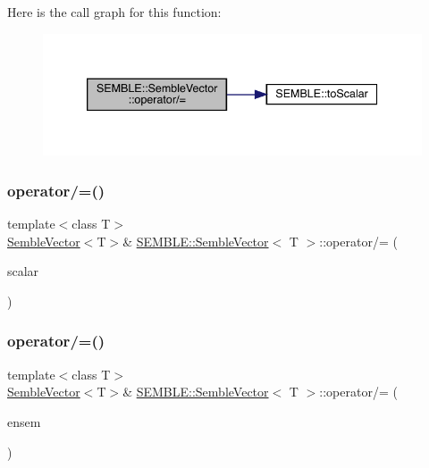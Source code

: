 Here is the call graph for this function\+:
\nopagebreak
\begin{figure}[H]
\begin{center}
\leavevmode
\includegraphics[width=339pt]{d9/d94/structSEMBLE_1_1SembleVector_a4158fb12d451d53f12b9f922d8106630_cgraph}
\end{center}
\end{figure}
\mbox{\label{structSEMBLE_1_1SembleVector_a00a31502846c4ed836390808446882e8}} 
\subsubsection{\texorpdfstring{operator/=()}{operator/=()}\hspace{0.1cm}{\footnotesize\ttfamily [4/6]}}
{\footnotesize\ttfamily template$<$class T$>$ \\
\mbox{\hyperlink{structSEMBLE_1_1SembleVector}{Semble\+Vector}}$<$T$>$\& \mbox{\hyperlink{structSEMBLE_1_1SembleVector}{S\+E\+M\+B\+L\+E\+::\+Semble\+Vector}}$<$ T $>$\+::operator/= (\begin{DoxyParamCaption}\item[{const typename \mbox{\hyperlink{structSEMBLE_1_1PromoteScalar}{Promote\+Scalar}}$<$ T $>$\+::Type \&}]{scalar }\end{DoxyParamCaption})}

\mbox{\label{structSEMBLE_1_1SembleVector_af78836c9cd297a39e8f7f48bd02858a1}} 
\subsubsection{\texorpdfstring{operator/=()}{operator/=()}\hspace{0.1cm}{\footnotesize\ttfamily [5/6]}}
{\footnotesize\ttfamily template$<$class T$>$ \\
\mbox{\hyperlink{structSEMBLE_1_1SembleVector}{Semble\+Vector}}$<$T$>$\& \mbox{\hyperlink{structSEMBLE_1_1SembleVector}{S\+E\+M\+B\+L\+E\+::\+Semble\+Vector}}$<$ T $>$\+::operator/= (\begin{DoxyParamCaption}\item[{const typename \mbox{\hyperlink{structSEMBLE_1_1PromoteEnsem}{Promote\+Ensem}}$<$ T $>$\+::Type \&}]{ensem }\end{DoxyParamCaption})}

